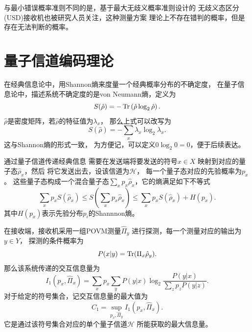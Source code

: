 与最小错误概率准则不同的是，基于最大无歧义概率准则设计的
无歧义态区分(USD)接收机也被研究人员关注，这种测量方案
理论上不存在错判的概率，但是存在无法判断的概率\cite{becerra2013implementation}。



\section{量子信道编码理论}

在经典信息论中，用Shannon熵来度量一个经典概率分布的不确定度\cite{jd2001xxlybm}，
在量子信息论中，描述系统不确定度的是von Neumann熵，定义为\cite{nielsen2005qcqi,nielsen2010quantum}
\begin{equation}
S(\hat{\rho}) = -\Tr\left( \hat{\rho} \log_2 \hat{\rho} \right).
\end{equation}
$\hat{\rho}$是密度矩阵，若$\hat{\rho}$的特征值为$\lambda_x$，
那么上式可以改写为
\begin{equation}
S(\hat{\rho}) = -\sum_x \lambda_x \log_2 \lambda_x.
\end{equation}
这与Shannon熵的形式一致，
为方便记，可以定义$0\log_2 0=0$，便于后续表达。

通过量子信道传递经典信息
需要在发送端将要发送的符号$x \in X$
映射到对应的量子态$\hat{\rho}_x$，然后
将它发送出去，设该信道为$\mathcal{H}$，
每一个量子态对应的先验概率为$p_x$。
这些量子态构成一个混合量子态$\sum_x p_x\hat{\rho}_x$，它的熵满足如下不等式\cite{nielsen2005qcqi}
\begin{equation}
\sum_x p_x S(\hat{\rho}_x) \le S(\sum_x p_x\hat{\rho}_x) \le \sum_x p_x S(\hat{\rho}_x) + H(p_x).
\label{eq:QI-low-up-bound}
\end{equation}
其中$H(p_x)$表示先验分布$p_i$的Shannnon熵。

在接收端，接收机采用一组POVM测量$\hat{\Pi}_y$
进行探测，每一个测量对应的输出为$y \in Y$，
探测的条件概率为
\begin{equation}
P(x|y) = \Tr(\Pi_x \hat{\rho}_y ).
\end{equation}
那么该系统传递的交互信息量为
\begin{equation}
I_1(p_x, \hat{\Pi}_x) = \sum_x p_x \sum_y P(y|x) \log_2  \frac{P(y|x)}{\sum_z p_z P(y|z)}.
\end{equation}
对于给定的符号集合，记交互信息量的最大值为
\begin{equation}
C_1= \sup_{p_x,\hat{\Pi}_y} I_1(p_x, \hat{\Pi}_x).
\end{equation}
它是通过该符号集合对应的单个量子信道$\mathcal{H}$
所能获取的最大信息量。


